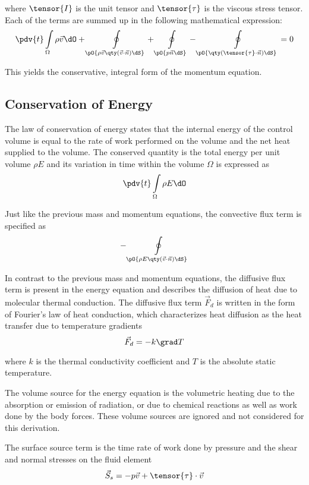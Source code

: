 \noindent
where $\tensor{I}$ is the unit tensor and $\tensor{\tau}$ is the viscous stress tensor. Each of the terms are summed up in the following mathematical expression: 
%
\begin{equation} \pdv{t}\int\limits_\Omega{\rho\vec{v} \dO} + \oint\limits_\pO{\rho\vec{v}\qty(\vec{v}\cdot\vec{n})\dS} + \oint\limits_\pO{p\vec{n}\dS} - \oint\limits_\pO{\qty(\tensor{\tau}\cdot\vec{n})\dS} = 0 \label{eq:momentum} \end{equation}

\noindent
This yields the conservative, integral form of the momentum equation.

\subsection{Conservation of Energy}

The law of conservation of energy states that the internal energy of the control volume is equal to the rate of work performed on the volume and the net heat supplied to the volume. The conserved quantity is the total energy per unit volume $\rho E$ and its variation in time within the volume $\Omega$ is expressed as
%
$$ \pdv{t}\int\limits_\Omega{\rho E \dO} $$

Just like the previous mass and momentum equations, the convective flux term is specified as 
%
$$ - \oint\limits_\pO{\rho E \qty(\vec{v}\cdot\vec{n})\dS} $$

In contrast to the previous mass and momentum equations, the diffusive flux term is present in the energy equation and describes the diffusion of heat due to molecular thermal conduction. The diffusive flux term $\vec{F}_d$ is written in the form of Fourier's law of heat conduction, which characterizes heat diffusion as the heat transfer due to temperature gradients
%
$$ \vec{F}_d = -k\grad T $$

\noindent
where $k$ is the thermal conductivity coefficient and $T$ is the absolute static temperature.

The volume source for the energy equation is the volumetric heating due to the absorption or emission of radiation, or due to chemical reactions as well as work done by the body forces. These volume sources are ignored and not considered for this derivation.

The surface source term is the time rate of work done by pressure and the shear and normal stresses on the fluid element
%
$$ \vec{S}_s = - p\vec{v} + \tensor{\tau}\cdot\vec{v} $$

